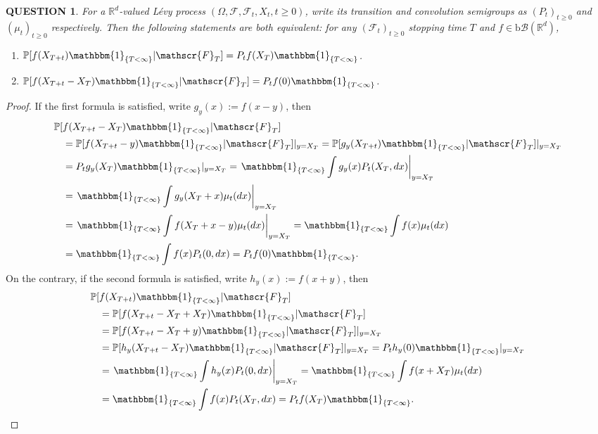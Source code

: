 \documentclass[12pt]{article}
\renewcommand{\b}{\mathscr{B}}
\renewcommand{\(}{\left(}%
\renewcommand{\)}{\right)}%
\renewcommand{\[}{\left[}%
\renewcommand{\]}{\right]}%
\renewcommand{\r}{\mathbb{R}}
\newcommand{\p}{\mathbb{P}}
\newcommand{\f}{\mathscr{F}}
\newtheorem{question}{QUESTION}[section]}
\newtheorem{proof}{Proof.}}
\begin{document}
  \begin{question}
  	For a $\r^d$-valued L\'evy process $(\Omega,\f,\f_t, X_t,t\geq 0)$, write its transition and convolution semigroups as $(P_t)_{t\geq 0}$ and $(\mu_t)_{t\geq 0}$ respectively. Then  the following statements are both equivalent: for any $(\f_t)_{t\geq 0}$ stopping time $T$ and $f\in\mathrm{b}\b(\r^d)$,
  	\begin{enumerate}
  		\item $\p[f(X_{T+t})\mathbbm{1}_{\{T<\infty\}}|\f_T]=P_tf(X_T)\mathbbm{1}_{\{T<\infty\}}$.
  		\item $\p[f(X_{T+t}-X_T)\mathbbm{1}_{\{T<\infty\}}|\f_T]=P_tf(0)\mathbbm{1}_{\{T<\infty\}}$.
  	\end{enumerate}
  \end{question}
  \begin{proof}
  	If the first formula is satisfied, write $g_y(x):=f(x-y)$, then
  	\begin{equation*}
  		\begin{split}
  			\p[&f(X_{T+t}-X_T)\mathbbm{1}_{\{T<\infty\}}|\f_T]\\
  			&=\p[f(X_{T+t}-y)\mathbbm{1}_{\{T<\infty\}}|\f_T]|_{y=X_T}=\p[g_y(X_{T+t})\mathbbm{1}_{\{T<\infty\}}|\f_T]|_{y=X_T}\\
  			&=P_tg_y(X_T)\mathbbm{1}_{\{T<\infty\}}|_{y=X_T}=\left.\mathbbm{1}_{\{T<\infty\}}\int g_y(x)P_t(X_T,dx)\right|_{y=X_T}\\
  			&=\left.\mathbbm{1}_{\{T<\infty\}}\int g_y(X_T+x)\mu_t(dx)\right|_{y=X_T}\\
  			&=\left.\mathbbm{1}_{\{T<\infty\}}\int f(X_T+x-y)\mu_t(dx)\right|_{y=X_T}=\mathbbm{1}_{\{T<\infty\}}\int f(x)\mu_t(dx)\\
  			&=\mathbbm{1}_{\{T<\infty\}}\int f(x)P_t(0,dx)=P_tf(0)\mathbbm{1}_{\{T<\infty\}}.
  		\end{split}
  	\end{equation*}
  	On the contrary, if the second formula is satisfied, write $h_y(x):=f(x+y)$, then 
  	\begin{equation*}
  		\begin{split}
  			\p[&f(X_{T+t})\mathbbm{1}_{\{T<\infty\}}|\f_T]\\
  			&=\p[f(X_{T+t}-X_T+X_T)\mathbbm{1}_{\{T<\infty\}}|\f_T]\\
  			&=\p[f(X_{T+t}-X_T+y)\mathbbm{1}_{\{T<\infty\}}|\f_T]|_{y=X_T}\\
  			&=\p[h_y(X_{T+t}-X_T)\mathbbm{1}_{\{T<\infty\}}|\f_T]|_{y=X_T}=P_th_y(0)\mathbbm{1}_{\{T<\infty\}}|_{y=X_T}\\
  			&=\left.\mathbbm{1}_{\{T<\infty\}}\int h_y(x)P_t(0,dx)\right|_{y=X_T}=\mathbbm{1}_{\{T<\infty\}}\int f(x+X_T)\mu_t(dx)\\
  			&=\mathbbm{1}_{\{T<\infty\}}\int f(x)P_t(X_T,dx)=P_tf(X_T)\mathbbm{1}_{\{T<\infty\}}.
  		\end{split}
  	\end{equation*}
  \end{proof}
\end{document}

